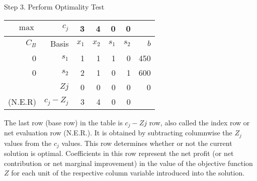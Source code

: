 \begin{frame}{Step 3. Perform Optimality Test}{}
  {\centering
    \begin{tabular}{rrrrrrr}
      \toprule
      $\max$& $c_j$  &3 &4 &0 &0 & \\
      \midrule
      $C_B$ &Basis&$x_1$&$x_2$&$s_1$&$s_2$&$b$\\
      \midrule
      0&$s_1$&1&1&1&0&450\\
      0&$s_2$&2&1&0&1&600\\
      \midrule
      &$Zj$&0&0&0&0&0\\
      (N.E.R)&$c_j - Z_j$&\cellcolor{blue!30}3&\cellcolor{blue!30}4&\cellcolor{blue!30}0&\cellcolor{blue!30}0&\\
      \bottomrule
    \end{tabular}
    \par}

  The last row (base row) in the table is $c_j - Zj$ row, also called the index row or net evaluation row (N.E.R.). It is obtained by \alert{subtracting columnwise the $Z_j$ values from the $c_j$ values. This row determines whether or not the current solution is optimal}. Coefficients in this row represent the net profit (or net contribution or net marginal improvement) in the value of the objective function $Z$ for each unit of the respective column variable introduced into the solution.
\end{frame}

